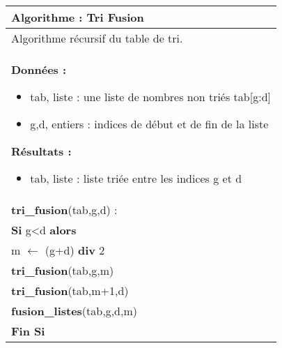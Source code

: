 \documentclass[10pt,fleqn]{article} %
\begin{document}
\begin{pseudo}
~\\
\begin{tabular}{p{}}
\hline
\textbf{Algorithme :} Tri Fusion \\
\hline
Algorithme récursif du table de tri. \\
\textbf{Données :}
\begin{itemize}
\item \textsf{tab}, liste : une liste de nombres non triés \textsf{tab[g:d]} 
\item \textsf{g,d}, entiers : indices de début et de fin de la liste
\end{itemize}
\textbf{Résultats :} 
\begin{itemize}
\item \textsf{tab}, liste : liste triée entre les indices \textsf{g} et \textsf{d}
\end{itemize}
\\
\textbf{tri\_fusion}(\textsf{tab,g,d}) :\\
\hspace{.4cm} \textbf{Si} \textsf{g<d}  \textbf{alors} \\
\hspace{.8cm} \textsf{m $\leftarrow$ (g+d)} \textbf{div} 2\\
\hspace{.8cm} \textbf{tri\_fusion}(tab,g,m) \\
\hspace{.8cm} \textbf{tri\_fusion}(tab,m+1,d) \\
\hspace{.8cm} \textbf{fusion\_listes}(tab,g,d,m) \\
\hspace{.4cm}  \textbf{Fin Si}\\
\hline
\end{tabular}
\end{pseudo}
\end{document}
